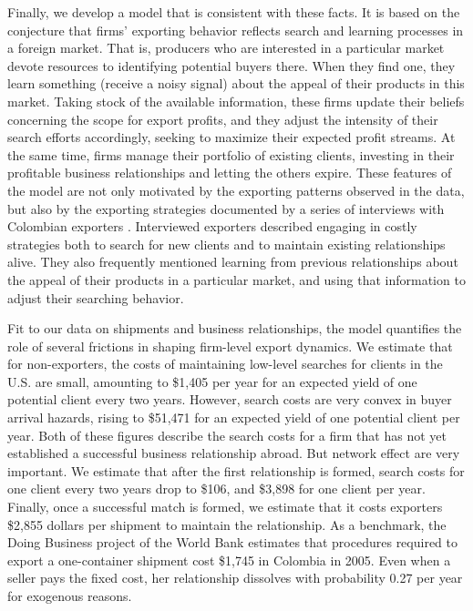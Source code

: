 Finally, we develop a model that is consistent with these facts. It is based
on the conjecture that firms' exporting behavior reflects search and
learning processes in a foreign market. That is, producers who are
interested in a particular market devote resources to identifying potential
buyers there. When they find one, they learn something (receive a noisy
signal) about the appeal of their products in this market. Taking stock of
the available information, these firms update their beliefs concerning the
scope for export profits, and they adjust the intensity of their search
efforts accordingly, seeking to maximize their expected profit streams. At
the same time, firms manage their portfolio of existing clients, investing
in their profitable business relationships and letting the others expire.
These features of the model are not only motivated by the exporting patterns
observed in the data, but also by the exporting strategies documented by a
series of interviews with Colombian exporters \citep{dominguez2010search}.
Interviewed exporters described engaging in costly strategies both to search
for new clients and to maintain existing relationships alive. They also
frequently mentioned learning from previous relationships about the appeal
of their products in a particular market, and using that information to
adjust their searching behavior.

Fit to our data on shipments and business relationships, the model
quantifies the role of several frictions in shaping firm-level export
dynamics. We estimate that for non-exporters, the costs of maintaining
low-level searches for clients in the U.S. are small, amounting to \$1,405
per year for an expected yield of one potential client every two years.
However, search costs are very convex in buyer arrival hazards, rising to
\$51,471 for an expected yield of one potential client per year. Both of
these figures describe the search costs for a firm that has not yet
established a successful business relationship abroad. But network effect
are very important. We estimate that after the first relationship is formed,
search costs for one client every two years drop to \$106, and \$3,898 for
one client per year. Finally, once a successful match is formed, we estimate
that it costs exporters \$2,855 dollars per shipment to maintain the
relationship. As a benchmark, the Doing Business project of the World Bank
estimates that procedures required to export a one-container shipment cost
\$1,745 in Colombia in 2005. Even when a seller pays the fixed cost, her
relationship dissolves with probability 0.27 per year for exogenous reasons.

